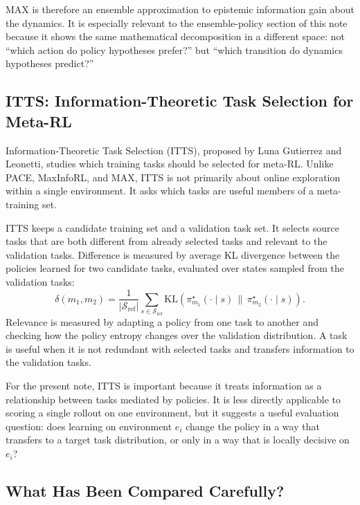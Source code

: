 \documentclass[11pt]{article}
\newcommand{\Sref}{\mathcal{S}_{\mathrm{ref}}}
\newcommand{\KL}{\mathrm{KL}}
\begin{document}
MAX is therefore an ensemble approximation to epistemic information gain about
the dynamics. It is especially relevant to the ensemble-policy section of this
note because it shows the same mathematical decomposition in a different space:
not ``which action do policy hypotheses prefer?'' but ``which transition do
dynamics hypotheses predict?''

\subsection{ITTS: Information-Theoretic Task Selection for Meta-RL}

Information-Theoretic Task Selection (ITTS), proposed by Luna Gutierrez and
Leonetti, studies which training tasks should be selected for meta-RL. Unlike
PACE, MaxInfoRL, and MAX, ITTS is not primarily about online exploration within a
single environment. It asks which tasks are useful members of a meta-training
set.

ITTS keeps a candidate training set and a validation task set. It selects source
tasks that are both different from already selected tasks and relevant to the
validation tasks. Difference is measured by average KL divergence between the
policies learned for two candidate tasks, evaluated over states sampled from the
validation tasks:
\begin{equation}
  \delta(m_1,m_2)
  =
  \frac{1}{|\Sref|}
  \sum_{s \in \Sref}
  \KL\left(
    \pi_{m_1}^{\star}(\cdot \mid s)
    \,\|\,
    \pi_{m_2}^{\star}(\cdot \mid s)
  \right).
\end{equation}
Relevance is measured by adapting a policy from one task to another and checking
how the policy entropy changes over the validation distribution. A task is useful
when it is not redundant with selected tasks and transfers information to the
validation tasks.

For the present note, ITTS is important because it treats information as a
relationship between tasks mediated by policies. It is less directly applicable
to scoring a single rollout on one environment, but it suggests a useful
evaluation question: does learning on environment $e_i$ change the policy in a
way that transfers to a target task distribution, or only in a way that is
locally decisive on $e_i$?

\subsection{What Has Been Compared Carefully?}
\end{document}
